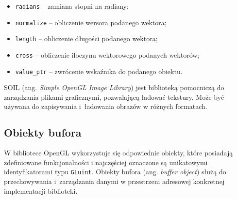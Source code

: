 \documentclass[12pt, twoside, openany]{report}
\begin{document}
\begin{itemize}

\item {\texttt{radians}} -- zamiana stopni na radiany;

\item {\texttt{normalize}} -- obliczenie wersora podanego wektora;

\item {\texttt{length}} -- obliczenie długości podanego wektora;

\item {\texttt{cross}} -- obliczenie iloczynu wektorowego podanych wektorów;

\item {\texttt{value\_ptr}} -- zwrócenie wskaźnika do podanego obiektu.

\end{itemize}




SOIL (ang. \textit{Simple OpenGL Image Library}) jest biblioteką pomocniczą do zarządzania plikami graficznymi, pozwalającą ładować tekstury. Może być używana do zapisywania i~ładowania obrazów w różnych formatach.




\subsection{Obiekty bufora}
\label{obiekty_bufora}

W bibliotece OpenGL wykorzystuje się odpowiednie obiekty, które posiadają zdefiniowane funkcjonalności i najczęściej oznaczone są unikatowymi identyfikatorami typu \texttt{GLuint}. Obiekty bufora (ang. \textit{buffer object}) służą do przechowywania i~zarządzania danymi w przestrzeni adresowej konkretnej implementacji biblioteki.
\end{document}
